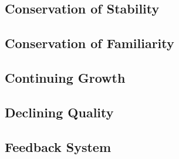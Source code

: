 
\subsection{Conservation of Stability} %
\label{sub:conservation_of_stability}


\subsection{Conservation of Familiarity} %
\label{sub:conservation_of_familiarity}


\subsection{Continuing Growth} %
\label{sub:continuing_growth}


\subsection{Declining Quality} %
\label{sub:declining_quality}


\subsection{Feedback System} %
\label{sub:feedback_system}


